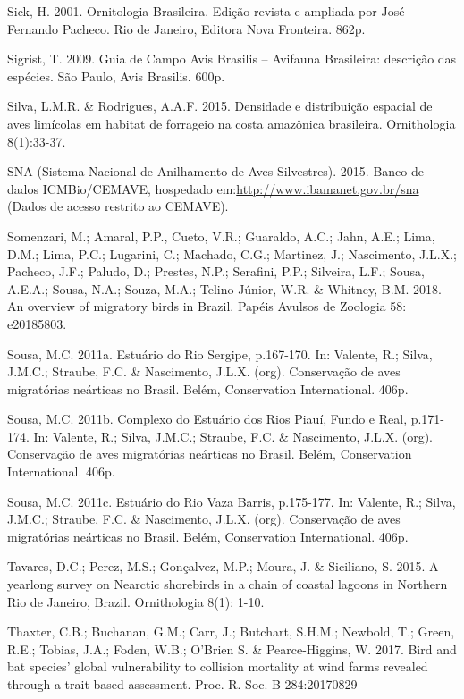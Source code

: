 \documentclass[
  oneside]{scrbook}
\begin{document}
Sick, H. 2001. Ornitologia Brasileira. Edição revista e ampliada por José Fernando Pacheco. Rio de Janeiro, Editora Nova Fronteira. 862p.

Sigrist, T. 2009. Guia de Campo Avis Brasilis -- Avifauna Brasileira: descrição das espécies. São Paulo, Avis Brasilis. 600p.

Silva, L.M.R. \& Rodrigues, A.A.F. 2015. Densidade e distribuição espacial de aves limícolas em habitat de forrageio na costa amazônica brasileira. Ornithologia 8(1):33-37.

SNA (Sistema Nacional de Anilhamento de Aves Silvestres). 2015. Banco de dados ICMBio/CEMAVE, hospedado em:\url{http://www.ibamanet.gov.br/sna} (Dados de acesso restrito ao CEMAVE).

Somenzari, M.; Amaral, P.P., Cueto, V.R.; Guaraldo, A.C.; Jahn, A.E.; Lima, D.M.; Lima, P.C.; Lugarini, C.; Machado, C.G.; Martinez, J.; Nascimento, J.L.X.; Pacheco, J.F.; Paludo, D.; Prestes, N.P.; Serafini, P.P.; Silveira, L.F.; Sousa, A.E.A.; Sousa, N.A.; Souza, M.A.; Telino-Júnior, W.R. \& Whitney, B.M. 2018. An overview of migratory birds in Brazil. Papéis Avulsos de Zoologia 58: e20185803.

Sousa, M.C. 2011a. Estuário do Rio Sergipe, p.167-170. In: Valente, R.; Silva, J.M.C.; Straube, F.C. \& Nascimento, J.L.X. (org). Conservação de aves migratórias neárticas no Brasil. Belém, Conservation International. 406p.

Sousa, M.C. 2011b. Complexo do Estuário dos Rios Piauí, Fundo e Real, p.171-174. In: Valente, R.; Silva, J.M.C.; Straube, F.C. \& Nascimento, J.L.X. (org). Conservação de aves migratórias neárticas no Brasil. Belém, Conservation International. 406p.

Sousa, M.C. 2011c. Estuário do Rio Vaza Barris, p.175-177. In: Valente, R.; Silva, J.M.C.; Straube, F.C. \& Nascimento, J.L.X. (org). Conservação de aves migratórias neárticas no Brasil. Belém, Conservation International. 406p.

Tavares, D.C.; Perez, M.S.; Gonçalvez, M.P.; Moura, J. \& Siciliano, S. 2015. A yearlong survey on Nearctic shorebirds in a chain of coastal lagoons in Northern Rio de Janeiro, Brazil. Ornithologia 8(1): 1-10.

Thaxter, C.B.; Buchanan, G.M.; Carr, J.; Butchart, S.H.M.; Newbold, T.; Green, R.E.; Tobias, J.A.; Foden, W.B.; O'Brien S. \& Pearce-Higgins, W. 2017. Bird and bat species' global vulnerability to collision mortality at wind farms revealed through a trait-based assessment. Proc. R. Soc. B 284:20170829
\end{document}
